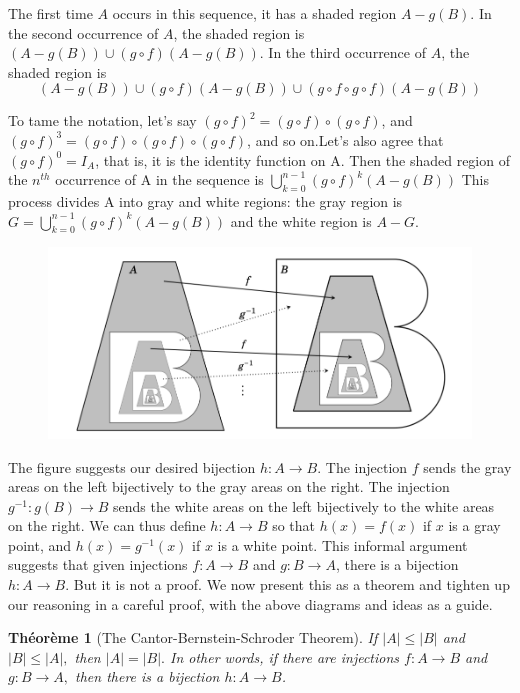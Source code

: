 \documentclass[12pt]{book}
\theoremstyle{definition}\newtheorem{dfn}{Définition}[chapter]
\theoremstyle{plain}\newtheorem{thm}{Théorème}[chapter]
\theoremstyle{plain}\newtheorem{prp}{Proposition}[chapter]
\theoremstyle{plain}\newtheorem{lem}{\bf Lemme}[chapter]
\theoremstyle{plain}\newtheorem{axm}{\bf Axiome}[chapter]
\theoremstyle{plain}\newtheorem{lmm}{\bf Lemme}[chapter]
\theoremstyle{plain}\newtheorem{exm}{\bf Example}[chapter]
\theoremstyle{plain}\newtheorem{cor}{\bf Corollaire}[chapter]
\theoremstyle{remark}\newtheorem{rem}{Remarque}[chapter]
\begin{document}
The first time $A$ occurs in this sequence, it has a shaded region $A-g(B) .$ In the second occurrence of $A$, the shaded region is $(A-g(B)) \cup(g \circ f)(A-g(B))$. In the third occurrence of $A$, the shaded region is
$$
(A-g(B)) \cup(g \circ f)(A-g(B)) \cup(g \circ f \circ g \circ f)(A-g(B))
$$

To tame the notation, let's say $(g \circ f)^{2}=(g \circ f) \circ(g \circ f)$, and $(g \circ f)^{3}=(g \circ f) \circ(g \circ f) \circ(g \circ f)$, and so on.Let's also agree that $(g \circ f)^{0}=I_{A}$, that is, it is the identity function on $\mathrm{A}$. Then the shaded region of the $n^{th}$ occurrence of $\mathrm{A}$ in the sequence is
$\bigcup\limits_{k=0}^{n-1}(g \circ f)^{k}(A-g(B))$
This process divides A into gray and white regions: the gray region is
$G=\bigcup\limits_{k=0}^{n-1}(g \circ f)^{k}(A-g(B))$
and the white region is $A-G$.
\begin{figure}[H]\centering\includegraphics[width=1.2\textwidth]{image//Vocabulaire de theorie des ensembles//4}\end{figure}
The figure suggests our desired bijection $h: A \rightarrow B$. The
injection $f$ sends the gray areas on the left bijectively to the gray
areas on the right. The injection $g^{-1}: g(B) \rightarrow B$ sends
the white areas on the left bijectively to the white areas on the
right. We can thus define $h: A \rightarrow B$ so that $h(x)=f(x)$ if
$x$ is a gray point, and $h(x)=g^{-1}(x)$ if $x$ is a white point.
This informal argument suggests that given injections $f: A \rightarrow B$ and $g: B \rightarrow A$, there is a bijection $h: A \rightarrow B$. But it is not a proof. We now present this as a theorem and tighten up our reasoning in a careful proof, with the above diagrams and ideas as a guide.
\begin{thm}[The Cantor-Bernstein-Schroder Theorem]
If $|A| \leq|B|$ and $|B| \leq|A|,$ then $|A|=|B| .$ In other words, if there are injections $f: A \rightarrow B$ and $g: B \rightarrow A,$ then there is a bijection $h: A \rightarrow B$.
\end{thm}
\end{document}
